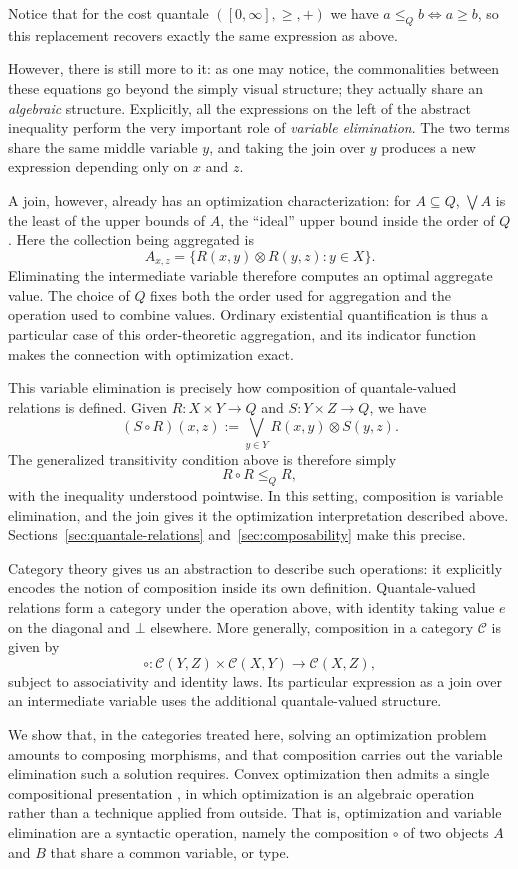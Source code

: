 Notice that for the cost quantale $([0,\infty],\ge,+)$ we have
$a\le_Q b \iff a\ge b$, so this replacement recovers exactly the same
expression as above.

However, there is still more to it: as one may notice, the commonalities
between these equations go beyond the simply visual structure;
they actually share an \textit{algebraic} structure.
Explicitly, all the expressions on the left of the abstract inequality
perform the very important role of \textit{variable elimination}.
The two terms share the same middle variable $y$, and taking the join
over $y$ produces a new expression depending only on $x$ and $z$.

A join, however, already has an optimization characterization:
for $A\subseteq Q$, $\bigvee A$ is the least of the upper bounds of $A$,
the ``ideal'' upper bound inside the order of $Q$.
Here the collection being aggregated is
\[
A_{x,z}=\{R(x,y)\otimes R(y,z):y\in X\}.
\]
Eliminating the intermediate variable therefore computes an optimal
aggregate value. The choice of $Q$ fixes both the order used for aggregation and
the operation used to combine values.
Ordinary existential quantification is thus a particular case of this
order-theoretic aggregation, and its indicator function makes the
connection with optimization exact.

This variable elimination is precisely how composition of
quantale-valued relations is defined. Given
$R:X\times Y\to Q$ and $S:Y\times Z\to Q$, we have
\[
(S\circ R)(x,z)
:=
\bigvee_{y\in Y}R(x,y)\otimes S(y,z).
\]
The generalized transitivity condition above is therefore simply
\[
R\circ R\le_Q R,
\]
with the inequality understood pointwise.
In this setting, composition is variable elimination, and the join
gives it the optimization interpretation described above.
Sections~\ref{sec:quantale-relations}
and~\ref{sec:composability} make this precise.

Category theory gives us an abstraction to describe such operations:
it explicitly encodes the notion of composition inside its own definition.
Quantale-valued relations form a category under the operation above,
with identity taking value $e$ on the diagonal and $\bot$ elsewhere.
More generally, composition in a category $\mathcal C$ is given by
\[
\circ:\mathcal C(Y,Z)\times\mathcal C(X,Y)
\longrightarrow\mathcal C(X,Z),
\]
subject to associativity and identity laws.
Its particular expression as a join over an intermediate variable
uses the additional quantale-valued structure.

We show that, in the categories treated here, solving an optimization
problem amounts to composing morphisms, and that composition carries out the
variable elimination such a solution requires. Convex optimization then admits a
single compositional presentation \cite{stein2024compositional, hanks2024compositionalopt}, 
in which optimization is an algebraic operation rather than a technique applied from outside.
That is, optimization and variable elimination are a syntactic operation,
namely the composition $\circ$ of two objects $A$ and $B$ that share a common variable, or type.

